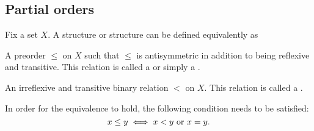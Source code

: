 \subsection{Partial orders}\label{subsec:partial_orders}

\begin{definition}\label{def:poset}
  Fix a set \( X \). A  structure or  structure can be defined equivalently as
  \begin{defenum}
     A preorder \( \leq \) on \( X \) such that \( \leq \) is antisymmetric in addition to being reflexive and transitive. This relation is called a  or simply a .

     An irreflexive and transitive binary relation \( < \) on \( X \). This relation is called a .
  \end{defenum}

  In order for the equivalence to hold, the following condition needs to be satisfied:
  \begin{equation*}
    x \leq y \iff x < y \text{ or } x = y.
  \end{equation*}
\end{definition}
